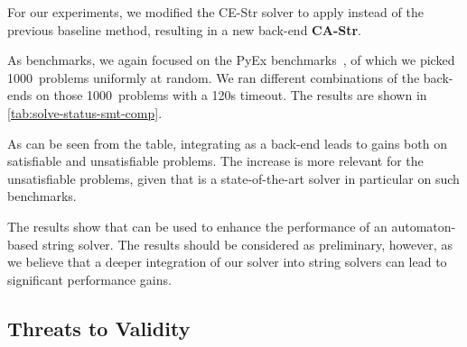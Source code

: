 For our experiments, we modified the CE-Str solver to apply \Catra{}
instead of the previous baseline method, resulting in a new back-end
\textbf{CA-Str}.

As benchmarks, we again focused on the PyEx benchmarks~\cite{pyex}, of
which we picked 1000~problems uniformly at random. We ran
different combinations of the
back-ends on those 1000~problems with a 120s timeout.
%
The results are shown in \cref{tab:solve-status-smt-comp}.
%

As can be seen from the table, integrating \Catra{} as a back-end
leads to gains both on satisfiable and unsatisfiable problems. The
increase is more relevant for the unsatisfiable problems, given that
\Ostrich{} is a state-of-the-art solver in particular on such benchmarks.

The results show that \Calculus{} can be used to enhance the
performance of an automaton-based string solver.
The results should be considered as preliminary, however, 
as we believe that a deeper integration of our \Catra{} solver into
string solvers can lead to significant performance gains.

\subsection{Threats to Validity}

